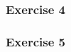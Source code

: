 \documentclass[10pt, t, allowdisplaybreaks]{beamer}
\begin{document}
\begin{frame}
    \frametitle{Exercise 4}

\end{frame}


\begin{frame}
    \frametitle{Exercise 5}

\end{frame}
\end{document}
